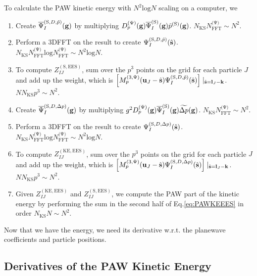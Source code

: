 \documentclass[paper=a4, fontsize=11pt]{article} %
\numberwithin{equation}{section} %
\numberwithin{figure}{section} %
\numberwithin{table}{section} %
\newcommand{\ol}{\overline}
\newcommand{\bu}{{\bf{u}}}
\newcommand{\bl}{{\bf{l}}}
\newcommand{\bk}{{\bf{k}}}
\newcommand{\bs}{{\bf{s}}}
\newcommand{\bg}{{\bf{g}}}
\newcommand{\hs}{{\hat{\bf{s}}}}
\newcommand{\rS}{{\mathrm{S}}}
\newcommand{\rKE}{{\mathrm{KE}}}
\newcommand{\rEES}{{\mathrm{EES}}}
\newcommand{\rl}{{\mathrm{log}}}
\newcommand{\psigs}{{\overline \Psi_I^{(\rS)}(\bg)}}
\newcommand{\NKS}{{N_{\mathrm{KS}}}}
\newcommand{\NFFTp}{{N^{\mathrm{(\Psi})}_{\mathrm{FFT}}}}
\newcommand{\Dpg}{{D^{(\Psi)}_p(\bg)}}
\newcommand{\Mp}{{M_p^{(3,\Psi)}}}
\begin{document}
To calculate the PAW kinetic energy with $N^2 \rl N$ scaling on a computer, we
\begin{enumerate}
\item Create $\ol \Psi_I^{(\rS,D,\tilde p)}(\bg)$ by multiplying $\Dpg \psigs \tilde p^{(\rS)}(\bg)$. $\NKS \NFFTp \sim N^2$.
\item Perform a 3DFFT on the result to create $\Psi_I^{(\rS,D,\tilde p)}(\hs)$. $\NKS \NFFTp \rl \NFFTp \sim N^2 \rl N$.
\item To compute $Z_{IJ}^{(\rS,\rEES)}$, sum over the $p^3$ points on the grid for each particle $J$ and add up the weight, which is $\left[\Mp(\bu_{J}-\hat \bs)\Psi_I^{(\rS,D,\tilde p)}(\hs)\right]\mid_{\hat \bs = \bl_J-\bk}$. $N \NKS p^3 \sim N^2$.
\item Create $\ol \Psi_I^{(\rS,D,\Delta p)}(\bg)$ by multiplying $g^2 \Dpg \psigs \widetilde{\Delta p}(\bg)$. $\NKS \NFFTp \sim N^2$.
\item Perform a 3DFFT on the result to create $\Psi_I^{(\rS,D,\Delta p)}(\hs)$. $\NKS \NFFTp \rl \NFFTp \sim N^2 \rl N$.
\item To compute $Z_{IJ}^{(\rKE,\rEES)}$, sum over the $p^3$ points on the grid for each particle $J$ and add up the weight, which is $\left[\Mp(\bu_{J}-\hat \bs)\Psi_I^{(\rS,D,\Delta p)}(\hs)\right]\mid_{\hat \bs = \bl_J-\bk}$. $N \NKS p^3 \sim N^2$.
\item Given $Z_{IJ}^{(\rKE,\rEES)}$ and $Z_{IJ}^{(\rS,\rEES)}$, we compute the PAW part of the kinetic energy by performing the sum in the second half of Eq.\eqref{eq:PAWKEEES} in order $\NKS N \sim N^2$.\\
\end{enumerate}

Now that we have the energy, we need its derivative w.r.t. the planewave coefficients and particle positions.

\subsection{Derivatives of the PAW Kinetic Energy}
\end{document}
